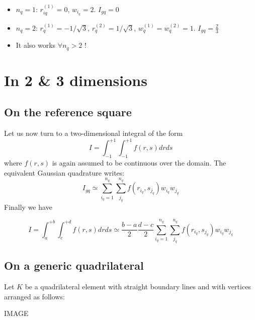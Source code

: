 \begin{itemize}
\item $n_q=1$: $r_{iq}^{(1)}=0$, $w_{i_q}=2$. $I_{gq}=0$
\item $n_q=2$: $r_{q}^{(1)}=-1/\sqrt{3}$, $r_{q}^{(2)}=1/\sqrt{3}$, $w_{q}^{(1)}=w_{q}^{(2)}=1$. $I_{gq}=\frac{2}{3}$
\item It also works $\forall n_q>2$ !
\end{itemize}


\newpage
\section{In 2 \& 3 dimensions}

\subsection{On the reference square}

Let us now turn to a two-dimensional integral of the form
\[
I=\int_{-1}^{+1} \int_{-1}^{+1} f(r,s) dr ds
\]
where $f(r,s)$ is again assumed to be continuous over the domain. 
The equivalent Gaussian quadrature writes:
\[
I_{gq}
\simeq \sum_{i_q=1}^{n_q}\sum_{j_q}^{n_q} f(r_{i_q},s_{j_q}) w_{i_q} w_{j_q}
\]
Finally we have 
\begin{mdframed}[backgroundcolor=blue!5]
\begin{equation}
I=\int_{a}^{+b}\int_{c}^{+d} f(r,s) dr ds
\simeq \frac{b-a}{2} \frac{d-c}{2} 
\sum_{i_q=1}^{n_q}\sum_{j_q}^{n_q} f(r_{i_q},s_{j_q}) w_{i_q} w_{j_q}
\end{equation}
\end{mdframed}



\subsection{On a generic quadrilateral}

Let $K$ be a quadrilateral element with straight boundary lines and with vertices 
arranged as follows:

IMAGE

